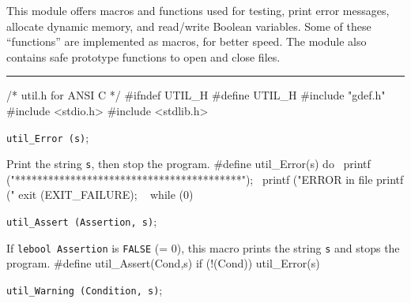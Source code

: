 
This module offers macros and functions used for testing, print error messages,
allocate dynamic memory, and read/write Boolean variables.
Some of these ``functions'' are implemented as macros, for better speed.
The module also contains safe prototype functions to open and close files.


\bigskip\hrule

\code\hide
/* util.h  for ANSI C */
#ifndef UTIL_H
#define UTIL_H
\endhide
#include "gdef.h"
#include <stdio.h>
#include <stdlib.h>
\endcode


\noindent 
{\tt util\_Error (s)};

 \tab  Print the string {\tt s}, then stop the program.
 \endtab
\code
\hide
#define util_Error(s) do { \
   printf ("\n\n******************************************\n"); \
   printf ("ERROR in file %
   printf ("%
   exit (EXIT_FAILURE); \
   } while (0)
\endhide
\endcode

\noindent 
{\tt util\_Assert (Assertion, s)};

 \tab  If {\tt lebool Assertion} is {\tt FALSE} (= 0), 
  this macro prints the string {\tt s} and stops the program.
 \endtab
\code
\hide
#define util_Assert(Cond,s) if (!(Cond)) util_Error(s)
\endhide
\endcode

\noindent 
{\tt util\_Warning (Condition, s)};

